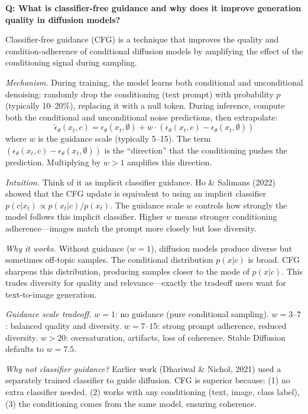 \begin{interviewq}
\textbf{Q: What is classifier-free guidance and why does it improve generation quality in diffusion models?}

 \quad {} \quad \badgefreq{\freqhigh}

\stronganswer Classifier-free guidance (CFG) is a technique that improves the quality and condition-adherence of conditional diffusion models by amplifying the effect of the conditioning signal during sampling.

\textit{Mechanism.} During training, the model learns both conditional and unconditional denoising: randomly drop the conditioning (text prompt) with probability $p$ (typically 10--20\%), replacing it with a null token. During inference, compute both the conditional and unconditional noise predictions, then extrapolate:
$$\tilde{\epsilon}_\theta(x_t, c) = \epsilon_\theta(x_t, \emptyset) + w \cdot (\epsilon_\theta(x_t, c) - \epsilon_\theta(x_t, \emptyset))$$
where $w$ is the guidance scale (typically 5--15). The term $(\epsilon_\theta(x_t, c) - \epsilon_\theta(x_t, \emptyset))$ is the ``direction'' that the conditioning pushes the prediction. Multiplying by $w > 1$ amplifies this direction.

\textit{Intuition.} Think of it as implicit classifier guidance. Ho \& Salimans (2022) showed that the CFG update is equivalent to using an implicit classifier $p(c|x_t) \propto p(x_t|c)/p(x_t)$. The guidance scale $w$ controls how strongly the model follows this implicit classifier. Higher $w$ means stronger conditioning adherence---images match the prompt more closely but lose diversity.

\textit{Why it works.} Without guidance ($w = 1$), diffusion models produce diverse but sometimes off-topic samples. The conditional distribution $p(x|c)$ is broad. CFG sharpens this distribution, producing samples closer to the mode of $p(x|c)$. This trades diversity for quality and relevance---exactly the tradeoff users want for text-to-image generation.

\textit{Guidance scale tradeoff.} $w = 1$: no guidance (pure conditional sampling). $w = 3$--$7$: balanced quality and diversity. $w = 7$--$15$: strong prompt adherence, reduced diversity. $w > 20$: oversaturation, artifacts, loss of coherence. Stable Diffusion defaults to $w = 7.5$.

\textit{Why not classifier guidance?} Earlier work (Dhariwal \& Nichol, 2021) used a separately trained classifier to guide diffusion. CFG is superior because: (1) no extra classifier needed, (2) works with any conditioning (text, image, class label), (3) the conditioning comes from the same model, ensuring coherence.


\end{interviewq}
